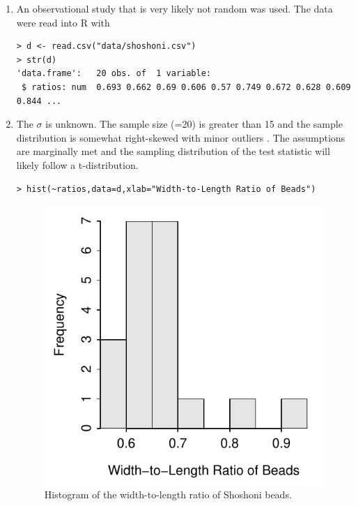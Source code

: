 \documentclass[10pt,openany]{book}\usepackage[]{graphicx}\usepackage[]{color}
\makeatletter
\newenvironment{kframe}{%
 \def\at@end@of@kframe{}%
 \ifinner\ifhmode%
  \def\at@end@of@kframe{\end{minipage}}%
  \begin{minipage}{\columnwidth}%
 \fi\fi%
 \def\FrameCommand##1{\hskip\@totalleftmargin \hskip-\fboxsep
 \colorbox{shadecolor}{##1}\hskip-\fboxsep
     \hskip-\linewidth \hskip-\@totalleftmargin \hskip\columnwidth}%
 \MakeFramed {\advance\hsize-\width
   \@totalleftmargin\z@ \linewidth\hsize
   \@setminipage}}%
 {\par\unskip\endMakeFramed%
 \at@end@of@kframe}
\newenvironment{knitrout}{}{} %
\makeatother
\begin{document}
\begin{itemize}
\begin{enumerate}
      \item An observational study that is very likely not random was used.  The data were read into R with
\begin{knitrout}
\color{fgcolor}\begin{kframe}
\begin{verbatim}
> d <- read.csv("data/shoshoni.csv")
> str(d)
'data.frame':	20 obs. of  1 variable:
 $ ratios: num  0.693 0.662 0.69 0.606 0.57 0.749 0.672 0.628 0.609 0.844 ...
\end{verbatim}
\end{kframe}
\end{knitrout}
      \item The $\sigma$ is unknown.  The sample size (=20) is greater than 15 and the sample distribution is somewhat right-skewed with minor outliers .  The assumptions are marginally met and the sampling distribution of the test statistic will likely follow a t-distribution.
\begin{knitrout}
\color{fgcolor}\begin{kframe}
\begin{verbatim}
> hist(~ratios,data=d,xlab="Width-to-Length Ratio of Beads")
\end{verbatim}
\end{kframe}\begin{figure}[hbtp]

{\centering \includegraphics[width=.4\linewidth]{Figs/BeadsHist-1} 

}

\caption[Histogram of the width-to-length ratio of Shoshoni beads]{Histogram of the width-to-length ratio of Shoshoni beads.}\label{fig:BeadsHist}
\end{figure}



\end{knitrout}
\end{enumerate}
\end{itemize}
\end{document}

